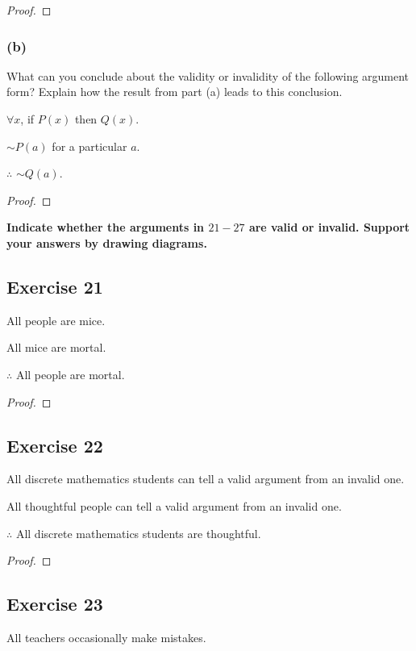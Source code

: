 \documentclass[14pt]{extarticle}
\newcommand{\fa}{\forall}
\begin{document}
\begin{proof}

\end{proof}

\subsubsection{(b)}
What can you conclude about the validity or invalidity of the following argument form? Explain how the result from part (a) leads to this conclusion.

$\fa x$, if $P(x)$ then $Q(x)$.

$\sim P(a)$ for a particular $a$.

$\therefore$ $\sim Q(a)$.

\begin{proof}

\end{proof}

{\bf \color{cyan} Indicate whether the arguments in $21-27$ are valid or invalid. Support your answers by drawing diagrams.}

\subsection{Exercise 21}
All people are mice.

All mice are mortal.

$\therefore$ All people are mortal.

\begin{proof}

\end{proof}

\subsection{Exercise 22}
All discrete mathematics students can tell a valid argument from an invalid one.

All thoughtful people can tell a valid argument from an invalid one.

$\therefore$ All discrete mathematics students are thoughtful.

\begin{proof}

\end{proof}

\subsection{Exercise 23}
All teachers occasionally make mistakes.
\end{document}
